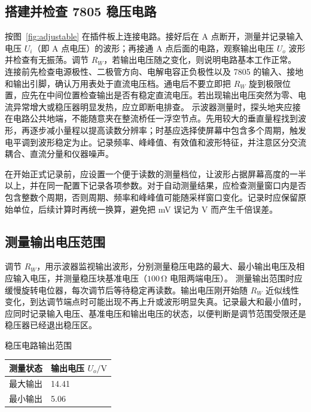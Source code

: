 \documentclass{../template/myrpt}
\begin{document}
\subsection{搭建并检查 7805 稳压电路}
按图~\ref{fig:adjustable} 在插件板上连接电路。接好后在 A 点断开，测量并记录输入电压 $U_i$（即 A 点电压）的波形；再接通 A 点后面的电路，观察输出电压 $U_o$ 波形并检查有无振荡。调节 $R_W$，若输出电压随之变化，则说明电路基本工作正常。
连接前先检查电源极性、二极管方向、电解电容正负极性以及 7805 的输入、接地和输出引脚，确认万用表处于直流电压档。通电后不要立即把 $R_W$ 旋到极限位置，应先在中间位置检查输出是否有稳定直流电压。若出现输出电压突然为零、电流异常增大或稳压器明显发热，应立即断电排查。
示波器测量时，探头地夹应接在电路公共地端，不能随意夹在整流桥任一浮空节点。先用较大的垂直量程找到波形，再逐步减小量程以提高读数分辨率；时基应选择使屏幕中包含多个周期，触发电平调到波形稳定为止。记录频率、峰峰值、有效值和波形特征，并注意区分交流耦合、直流分量和仪器噪声。

在开始正式记录前，应设置一个便于读数的测量档位，让波形占据屏幕高度的一半以上，并在同一配置下记录各项参数。对于自动测量结果，应检查测量窗口内是否包含整数个周期，否则周期、频率和峰峰值可能随采样窗口变化。记录时应保留原始单位，后续计算时再统一换算，避免把 \si{\milli\volt} 误记为 \si{\volt} 而产生千倍误差。

\subsection{测量输出电压范围}
调节 $R_W$，用示波器监视输出波形，分别测量稳压电路的最大、最小输出电压及相应输入电压，并测量稳压块基准电压（$100\,\si{\ohm}$ 电阻两端电压）。
测量输出范围时应缓慢旋转电位器，每次调节后等待稳定再读数。输出电压刚开始随 $R_W$ 近似线性变化，到达调节端点时可能出现不再上升或波形明显失真。记录最大和最小值时，应同时记录输入电压、基准电压和输出电压的状态，以便判断是调节范围受限还是稳压器已经退出稳压区。

\begin{LabRecordTable}
  \centering
  \caption{稳压电路输出范围}
  \label{table:output-range}
  \renewcommand{\arraystretch}{1.45}
  \small
  \begin{tabularx}{\textwidth}{C{5.0cm} Y}
    \toprule
    测量状态 & 输出电压 $U_o/\si{\volt}$ \\
    \midrule
    最大输出 & 14.41 \\
    最小输出 & 5.06 \\
    \bottomrule
  \end{tabularx}
\end{LabRecordTable}
\end{document}
